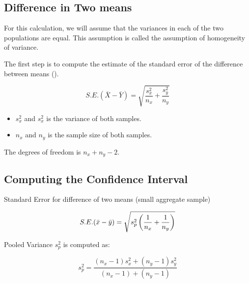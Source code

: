 

\subsection*{Difference in Two means}
For this calculation, we will assume that the variances in each of the two populations are equal. This assumption is called the assumption of homogeneity of variance.

The first step is to compute the estimate of the standard error of the difference between means ().

\[ S.E.(\bar{X}-\bar{Y}) = \sqrt{\frac{s^2_x}{n_x} + \frac{s^2_y}{n_y}} \]

\begin{itemize}
\item $s^2_x$ and $s^2_x$ is the variance of both samples.
\item $n_x$ and $n_y$ is the sample size of both samples.
\end{itemize}
The degrees of freedom is $n_x + n_y -2$.





\subsection*{Computing the Confidence Interval}
Standard Error for difference of two means (small aggregate sample)

\[ S.E.(\bar{x}-\bar{y}) = \sqrt{  s^2_p \left({1\over n_x}+{1\over n_y} \right)} \]

Pooled Variance $s^2_p$ is computed as:

\[ s^2_p = \frac{(n_x-1)s^2_x + (n_y-1)s^2_y}{(n_x-1) + (n_y-1)} \]
